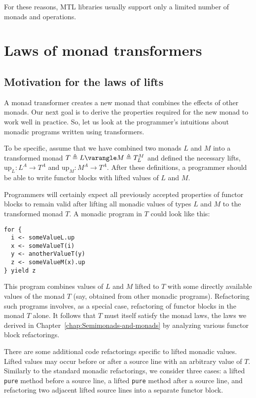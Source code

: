 For these reasons, MTL libraries usually support only a limited number
of monads and operations.

\section{Laws of monad transformers}

\subsection{Motivation for the laws of lifts}

A monad transformer creates a new monad that combines the effects
of other monads. Our next goal is to derive the properties required
for the new monad to work well in practice. So, let us look at the
programmer\textsf{'}s intuitions about monadic programs written using transformers.

To be specific, assume that we have combined two monads $L$ and $M$
into a transformed monad $T\triangleq L\varangle M\triangleq T_{L}^{M}$
and defined the necessary lifts, $\text{up}_{L}:L^{A}\rightarrow T^{A}$
and $\text{up}_{M}:M^{A}\rightarrow T^{A}$. After these definitions,
a programmer should be able to write functor blocks with lifted values
of $L$ and $M$. 

Programmers will certainly expect all previously accepted properties
of functor blocks to remain valid after lifting all monadic values
of types $L$ and $M$ to the transformed monad $T$. A monadic program
in $T$ could look like this:
\begin{lstlisting}
for {
  i <- someValueL.up
  x <- someValueT(i)
  y <- anotherValueT(y)
  z <- someValueM(x).up
} yield z
\end{lstlisting}
This program combines values of $L$ and $M$ lifted to $T$ with
some directly available values of the monad $T$ (say, obtained from
other monadic programs). Refactoring such programs involves, as a
special case, refactoring of functor blocks in the monad $T$ alone.
It follows that $T$ must itself satisfy the monad laws, \textemdash{}
the laws we derived in Chapter~\ref{chap:Semimonads-and-monads}
by analyzing various functor block refactorings. 

There are some additional code refactorings specific to lifted monadic
values. Lifted values may occur before or after a source line with
an arbitrary value of $T$. Similarly to the standard monadic refactorings,
we consider three cases: a lifted \lstinline!pure! method before
a source line, a lifted \lstinline!pure! method after a source line,
and refactoring two adjacent lifted source lines into a separate functor
block.


